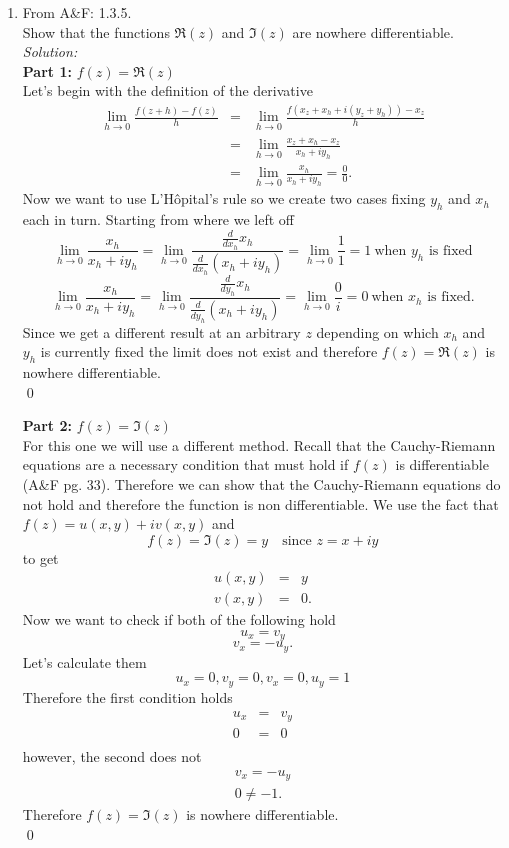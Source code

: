 \documentclass[10pt]{amsart}
\theoremstyle{nonumberplain}
\begin{document}
\begin{enumerate}[label={\bf {\arabic*}:}]
\item From A\&F: 1.3.5.\\
Show that the functions $\Re(z)$ and $\Im(z)$ are nowhere differentiable. \\
\textit{Solution:} \\
\textbf{Part 1:} $f(z) = \Re(z)$ \\
Let's begin with the definition of the derivative
\begin{eqnarray*}
\lim_{h \rightarrow 0} \frac{f(z + h) - f(z)}{h} &=& \lim_{h \rightarrow 0} \frac{f(x_z + x_h + i (y_z + y_h) ) - x_z}{h} \\
								 &=& \lim_{h \rightarrow 0} \frac{x_z + x_h - x_z}{x_h + iy_h} \\
								 &=& \lim_{h \rightarrow 0} \frac{x_h}{x_h + iy_h} = \frac{0}{0}.						
\end{eqnarray*}
Now we want to use L'Hôpital's rule so we create two cases fixing $y_h$ and $x_h$ each in turn.
Starting from where we left off
$$ \lim_{h \rightarrow 0} \frac{x_h}{x_h + iy_h} = \lim_{h \rightarrow 0} \frac{ \frac{d}{dx_h}x_h}{\frac{d}{dx_h}(x_h + iy_h)} = \lim_{h \rightarrow 0} \frac{1}{1} = 1 \: \text{when $y_h$ is fixed} $$
$$ \lim_{h \rightarrow 0} \frac{x_h}{x_h + iy_h} = \lim_{h \rightarrow 0} \frac{ \frac{d}{dy_h}x_h}{\frac{d}{dy_h}(x_h + iy_h)} = \lim_{h \rightarrow 0} \frac{0}{i} = 0 \: \text{when $x_h$ is fixed}. $$
Since we get a different result at an arbitrary $z$ depending on which $x_h$ and $y_h$ is currently fixed the limit does not exist and therefore $f(z) = \Re(z)$ is nowhere differentiable. \\
\qed

\noindent
\textbf{Part 2:} $f(z) = \Im(z)$ \\
For this one we will use a different method. Recall that the Cauchy-Riemann equations are a necessary condition that must hold if $f(z)$ is differentiable (A\&F pg. 33). Therefore we can show that the Cauchy-Riemann equations do not hold and therefore the function is non differentiable. We use the fact that $f(z) = u(x, y) + i v(x, y)$ and 
$$f(z) = \Im(z) = y \quad\text{since $z = x +iy$}$$
to get 
\begin{eqnarray*}
u(x, y) &=& y \\
v(x, y) &=& 0.
\end{eqnarray*}
Now we want to check if both of the following hold
$$u_x = v_y$$
$$v_x = - u_y.$$
Let's calculate them
$$u_x = 0, v_y = 0, v_x = 0, u_y = 1$$
Therefore the first condition holds
\begin{eqnarray*}
u_x &=& v_y \\
0 &=& 0 \\
\end{eqnarray*}
however, the second does not
\begin{eqnarray*}
v_x = - u_y \\
0 \neq - 1.
\end{eqnarray*}
Therefore $f(z) = \Im(z)$ is nowhere differentiable. \\
\qed


\end{enumerate}
\end{document}
